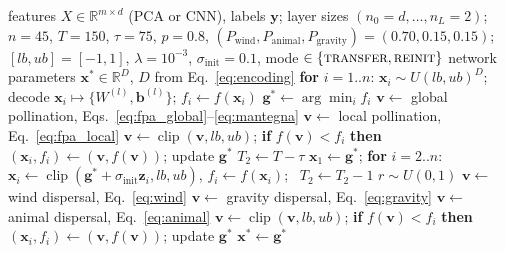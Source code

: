 \documentclass[preprint,12pt]{elsarticle}
\newcommand{\R}{\mathbb{R}}
\newcommand{\clip}{\operatorname{clip}}
\begin{document}
\begin{algorithm}[!t]
\caption{Sequential hybrid FPA--SDA for network-weight optimisation}\label{alg:hybrid}
\footnotesize
\begin{algorithmic}[1]
\Require features $X\in\R^{m\times d}$ (PCA or CNN), labels $\mathbf{y}$; layer sizes $(n_0{=}d,\dots,n_L{=}2)$;\Statex \hspace{\algorithmicindent} $n{=}45$, $T{=}150$, $\tau{=}75$, $p{=}0.8$, $(P_{\mathrm{wind}},P_{\mathrm{animal}},P_{\mathrm{gravity}}){=}(0.70,0.15,0.15)$;\Statex \hspace{\algorithmicindent} $[lb,ub]{=}[-1,1]$, $\lambda{=}10^{-3}$, $\sigma_{\mathrm{init}}{=}0.1$, mode $\in\{\textsc{transfer},\textsc{reinit}\}$
\Ensure network parameters $\mathbf{x}^{*}\in\R^{D}$, $D$ from Eq.~\eqref{eq:encoding}
\State \textbf{for} $i=1..n$: $\mathbf{x}_i\sim U(lb,ub)^D$; decode $\mathbf{x}_i\mapsto\{W^{(l)},\mathbf{b}^{(l)}\}$; $f_i\gets f(\mathbf{x}_i)$ 
\State $\mathbf{g}^{*}\gets\arg\min_i f_i$
 
     \State $\mathbf{v}\gets$ global pollination, Eqs.~\eqref{eq:fpa_global}--\eqref{eq:mantegna}
    \Else \State $\mathbf{v}\gets$ local pollination, Eq.~\eqref{eq:fpa_local}
    \EndIf
    \State $\mathbf{v}\gets\clip(\mathbf{v},lb,ub)$; \textbf{if} $f(\mathbf{v})< f_i$ \textbf{then} $(\mathbf{x}_i,f_i)\gets(\mathbf{v},f(\mathbf{v}))$; update $\mathbf{g}^{*}$
  \EndFor
\EndFor
\State $T_2\gets T-\tau$
 
  \State $\mathbf{x}_1\gets\mathbf{g}^{*}$; \textbf{for} $i=2..n$: $\mathbf{x}_i\gets\clip(\mathbf{g}^{*}+\sigma_{\mathrm{init}}\mathbf{z}_i,lb,ub)$, $f_i\gets f(\mathbf{x}_i)$; \ $T_2\gets T_2-1$
\EndIf {}
 
    \State $r\sim U(0,1)$
     \State $\mathbf{v}\gets$ wind dispersal, Eq.~\eqref{eq:wind}
     \State $\mathbf{v}\gets$ gravity dispersal, Eq.~\eqref{eq:gravity}
    \Else \State $\mathbf{v}\gets$ animal dispersal, Eq.~\eqref{eq:animal}
    \EndIf
    \State $\mathbf{v}\gets\clip(\mathbf{v},lb,ub)$; \textbf{if} $f(\mathbf{v})< f_i$ \textbf{then} $(\mathbf{x}_i,f_i)\gets(\mathbf{v},f(\mathbf{v}))$; update $\mathbf{g}^{*}$
  \EndFor
\EndFor
\State \Return $\mathbf{x}^{*}\gets\mathbf{g}^{*}$
\end{algorithmic}
\end{algorithm}
\end{document}
